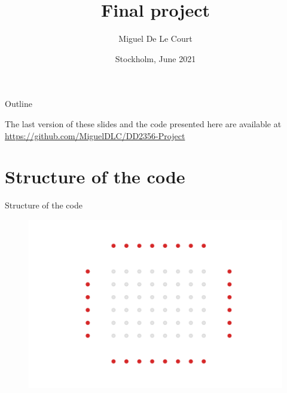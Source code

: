 \documentclass{beamer}
\title[Short Title]{%
    \color{white} Final project
    \vspace{0.5cm}
}
\author{Miguel De Le Court}
\institute{
        \textit{Methods in High performance computing}\\
        \textit{DD2356}
        \vspace{0.5cm}
}
\date[Venue and Date]{%
   Stockholm, June 2021 
}
\begin{document}

{
    \maketitle
}

\begin{frame}{Outline}
\tableofcontents

\vfill
\begin{center}
    \footnotesize The last version of these slides and the code presented here are available at \url{https://github.com/MiguelDLC/DD2356-Project}    
\end{center}

\end{frame}




\section{Structure of the code}
\begin{frame}{Structure of the code}
    \begin{figure}
        \centering
        \includegraphics[width=0.8\linewidth]{Figures/step0.pdf}
    \end{figure}
\end{frame}
\end{document}
